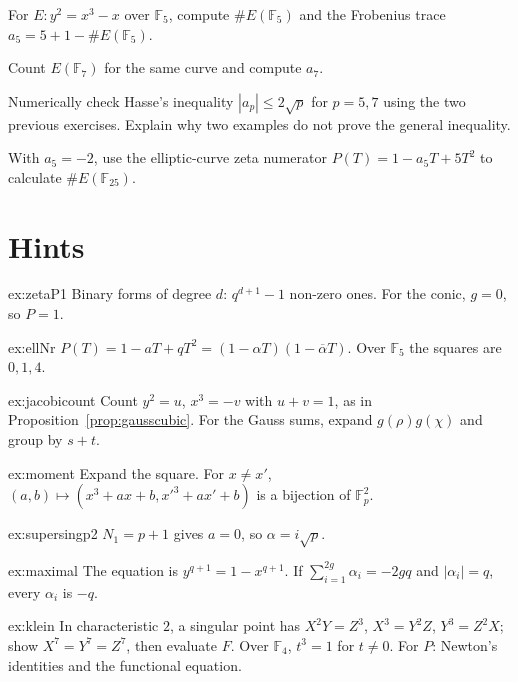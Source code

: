 \begin{exercise}[$\star$]\label{ex:v13-extra-16-1}
For $E:y^2=x^3-x$ over $\mathbb F_5$, compute $\#E(\mathbb F_5)$ and the Frobenius trace $a_5=5+1-\#E(\mathbb F_5)$.
\end{exercise}

\begin{exercise}[$\star$]\label{ex:v13-extra-16-2}
Count $E(\mathbb F_7)$ for the same curve and compute $a_7$.
\end{exercise}

\begin{exercise}[$\star\star$]\label{ex:v13-extra-16-3}
Numerically check Hasse's inequality $|a_p|\le2\sqrt p$ for $p=5,7$ using the two previous exercises. Explain why two examples do not prove the general inequality.
\end{exercise}

\begin{exercise}[$\star\star\star$]\label{ex:v13-extra-16-4}
With $a_5=-2$, use the elliptic-curve zeta numerator $P(T)=1-a_5T+5T^2$ to calculate $\#E(\mathbb F_{25})$.
\end{exercise}

\section{Hints}

\begin{hint}{ex:zetaP1}
Binary forms of degree $d$: $q^{d+1}-1$ non-zero ones. For the conic, $g=0$, so $P=1$.
\end{hint}
\begin{hint}{ex:ellNr}
$P(T)=1-aT+qT^2=(1-\alpha T)(1-\overline\alpha T)$. Over $\mathbb F_5$ the squares are $0,1,4$.
\end{hint}
\begin{hint}{ex:jacobicount}
Count $y^2=u$, $x^3=-v$ with $u+v=1$, as in Proposition~\ref{prop:gausscubic}. For the Gauss sums, expand $g(\rho)g(\chi)$ and group by $s+t$.
\end{hint}
\begin{hint}{ex:moment}
Expand the square. For $x\ne x'$, $(a,b)\mapsto(x^3+ax+b,x'^3+ax'+b)$ is a bijection of $\mathbb F_p^2$.
\end{hint}
\begin{hint}{ex:supersingp2}
$N_1=p+1$ gives $a=0$, so $\alpha=i\sqrt p$.
\end{hint}
\begin{hint}{ex:maximal}
The equation is $y^{q+1}=1-x^{q+1}$. If $\sum_{i=1}^{2g}\alpha_i=-2gq$ and $|\alpha_i|=q$, every $\alpha_i$ is $-q$.
\end{hint}
\begin{hint}{ex:klein}
In characteristic $2$, a singular point has $X^2Y=Z^3$, $X^3=Y^2Z$, $Y^3=Z^2X$; show $X^7=Y^7=Z^7$, then evaluate $F$. Over $\mathbb F_4$, $t^3=1$ for $t\ne0$.
For $P$: Newton's identities and the functional equation.
\end{hint}

